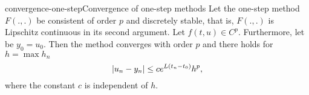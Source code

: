 \begin{Theorem*}{convergence-one-step}{Convergence of one-step methods}
  Let the one-step method $F(.,.)$ be consistent of order $p$ and
  discretely stable, that is, $F(.,.)$ is Lipschitz continuous in its
  second argument. Let $f(t,u)\in C^{p}$. Furthermore, let be
  $y_0 = u_0$. Then the method converges with order $p$ and there
  holds for $h = \max h_n$
  \begin{equation}
    \label{eq:convergence-onestep:1}
    \lvert u_n - y_n\rvert \le c e^{L(t_n-t_0)} h^p,
  \end{equation}
  where the constant $c$ is independent of $h$.
\end{Theorem*}

